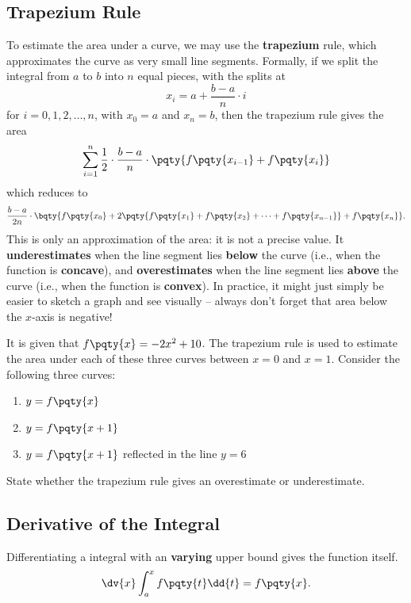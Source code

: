 \documentclass{article}
\begin{document}
\subsection{Trapezium Rule}

To estimate the area under a curve, we may use the \textbf{trapezium} rule, which approximates the curve as very small line segments. Formally, if we split the integral from \(a\) to \(b\) into \(n\) equal pieces, with the splits at
\[
    x_i = a + \frac{b - a}{n} \cdot i
\]
for \(i = 0, 1, 2, \ldots, n\), with \(x_0 = a\) and \(x_n = b\), then the trapezium rule gives the area
\[
    \sum_{i = 1}^{n} \frac{1}{2} \cdot \frac{b - a}{n} \cdot \pqty{f\pqty{x_{i - 1}} + f\pqty{x_i}}
\]
which reduces to
\[
    \frac{b - a}{2n} \cdot \bqty{f\pqty{x_0} + 2\pqty{f\pqty{x_1} + f\pqty{x_2} + \cdots + f\pqty{x_{n - 1}}} + f\pqty{x_n}}.
\]
This is only an approximation of the area: it is not a precise value. It \textbf{underestimates} when the line segment lies \textbf{below} the curve (i.e., when the function is \textbf{concave}), and \textbf{overestimates} when the line segment lies \textbf{above} the curve (i.e., when the function is \textbf{convex}). In practice, it might just simply be easier to sketch a graph and see visually -- always don't forget that area below the \(x\)-axis is negative!

\begin{example}[TMUA 2017 P1 Q15]
    It is given that \(f\pqty{x} = - 2x^2 + 10\). The trapezium rule is used to estimate the area under each of these three curves between \(x = 0\) and \(x = 1\). Consider the following three curves:
    \begin{enumerate}[label=\Roman*.]
        \item \(y = f\pqty{x}\)
        \item \(y = f\pqty{x + 1}\)
        \item \(y = f\pqty{x + 1}\) reflected in the line \(y = 6\)
    \end{enumerate}

    State whether the trapezium rule gives an overestimate or underestimate.
\end{example}

\subsection{Derivative of the Integral}

Differentiating a integral with an \textbf{varying} upper bound gives the function itself.
\[
    \dv{x} \int_{a}^{x} f\pqty{t} \dd{t} = f\pqty{x}.
\]
\end{document}
